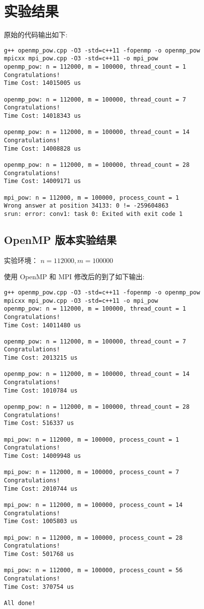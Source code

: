\documentclass[a4paper, 12pt]{article}
\begin{document}
\section{实验结果}
原始的代码输出如下:
\begin{verbatim}
g++ openmp_pow.cpp -O3 -std=c++11 -fopenmp -o openmp_pow
mpicxx mpi_pow.cpp -O3 -std=c++11 -o mpi_pow
openmp_pow: n = 112000, m = 100000, thread_count = 1
Congratulations!
Time Cost: 14015005 us

openmp_pow: n = 112000, m = 100000, thread_count = 7
Congratulations!
Time Cost: 14018343 us

openmp_pow: n = 112000, m = 100000, thread_count = 14
Congratulations!
Time Cost: 14008828 us

openmp_pow: n = 112000, m = 100000, thread_count = 28
Congratulations!
Time Cost: 14009171 us

mpi_pow: n = 112000, m = 100000, process_count = 1
Wrong answer at position 34133: 0 != -259604863
srun: error: conv1: task 0: Exited with exit code 1
\end{verbatim}

\subsection{OpenMP 版本实验结果}
实验环境：
$n = 112000, m = 100000$


使用 OpenMP 和 MPI 修改后的到了如下输出:
\begin{verbatim}
g++ openmp_pow.cpp -O3 -std=c++11 -fopenmp -o openmp_pow
mpicxx mpi_pow.cpp -O3 -std=c++11 -o mpi_pow
openmp_pow: n = 112000, m = 100000, thread_count = 1
Congratulations!
Time Cost: 14011480 us

openmp_pow: n = 112000, m = 100000, thread_count = 7
Congratulations!
Time Cost: 2013215 us

openmp_pow: n = 112000, m = 100000, thread_count = 14
Congratulations!
Time Cost: 1010784 us

openmp_pow: n = 112000, m = 100000, thread_count = 28
Congratulations!
Time Cost: 516337 us

mpi_pow: n = 112000, m = 100000, process_count = 1
Congratulations!
Time Cost: 14009948 us

mpi_pow: n = 112000, m = 100000, process_count = 7
Congratulations!
Time Cost: 2010744 us

mpi_pow: n = 112000, m = 100000, process_count = 14
Congratulations!
Time Cost: 1005803 us

mpi_pow: n = 112000, m = 100000, process_count = 28
Congratulations!
Time Cost: 501768 us

mpi_pow: n = 112000, m = 100000, process_count = 56
Congratulations!
Time Cost: 370754 us

All done!
\end{verbatim}
\end{document}
